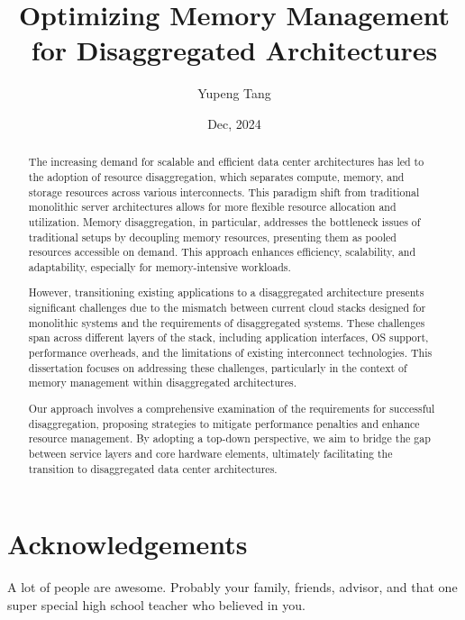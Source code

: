 \documentclass[letterpaper,11pt]{yalephd}
\begin{document}
\title{Optimizing Memory Management for Disaggregated Architectures} 
\author{Yupeng Tang}
\date{Dec, 2024} 

\frontmatter

\begin{abstract}
The increasing demand for scalable and efficient data center architectures has led to the adoption of resource disaggregation, which separates compute, memory, and storage resources across various interconnects. This paradigm shift from traditional monolithic server architectures allows for more flexible resource allocation and utilization. Memory disaggregation, in particular, addresses the bottleneck issues of traditional setups by decoupling memory resources, presenting them as pooled resources accessible on demand. This approach enhances efficiency, scalability, and adaptability, especially for memory-intensive workloads.

However, transitioning existing applications to a disaggregated architecture presents significant challenges due to the mismatch between current cloud stacks designed for monolithic systems and the requirements of disaggregated systems. These challenges span across different layers of the stack, including application interfaces, OS support, performance overheads, and the limitations of existing interconnect technologies. This dissertation focuses on addressing these challenges, particularly in the context of memory management within disaggregated architectures.

Our approach involves a comprehensive examination of the requirements for successful disaggregation, proposing strategies to mitigate performance penalties and enhance resource management. By adopting a top-down perspective, we aim to bridge the gap between service layers and core hardware elements, ultimately facilitating the transition to disaggregated data center architectures.
\end{abstract}


\maketitle
{} 
\setcounter{tocdepth}{1}
\tableofcontents
\listoffigures %
\listoftables %

\chapter{Acknowledgements} %
A lot of people are awesome. Probably your family, friends, 
advisor, and that one super special high school teacher who
believed in you.
\end{document}
